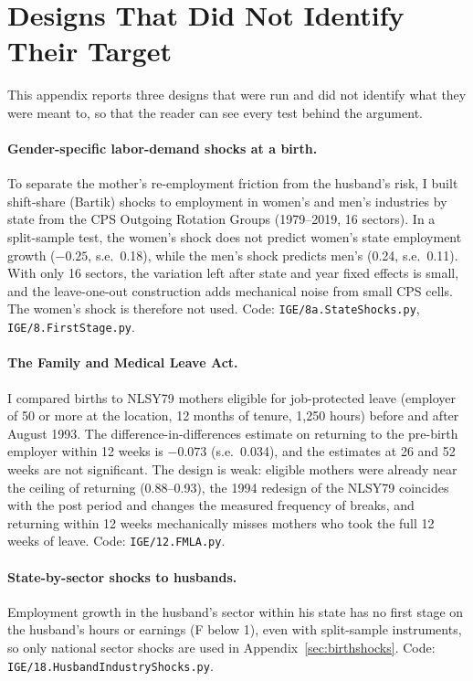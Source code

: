 \section{Designs That Did Not Identify Their Target}\label{app:designs}

This appendix reports three designs that were run and did not identify what they were meant to, so that the reader
can see every test behind the argument.

\paragraph{Gender-specific labor-demand shocks at a birth.} To separate the mother's re-employment friction from the
husband's risk, I built shift-share (Bartik) shocks to employment in women's and men's industries by state from the CPS
Outgoing Rotation Groups (1979--2019, 16 sectors). In a split-sample test, the women's shock does not predict women's
state employment growth ($-0.25$, s.e.\ 0.18), while the men's shock predicts men's (0.24, s.e.\ 0.11). With only 16
sectors, the variation left after state and year fixed effects is small, and the leave-one-out construction adds
mechanical noise from small CPS cells. The women's shock is therefore not used. Code: \texttt{IGE/8a.StateShocks.py},
\texttt{IGE/8.FirstStage.py}.

\paragraph{The Family and Medical Leave Act.} I compared births to NLSY79 mothers eligible for job-protected leave
(employer of 50 or more at the location, 12 months of tenure, 1,250 hours) before and after August 1993. The
difference-in-differences estimate on returning to the pre-birth employer within 12 weeks is $-0.073$ (s.e.\ 0.034), and
the estimates at 26 and 52 weeks are not significant. The design is weak: eligible mothers were already near the
ceiling of returning (0.88--0.93), the 1994 redesign of the NLSY79 coincides with the post period and changes the
measured frequency of breaks, and returning within 12 weeks mechanically misses mothers who took the full 12 weeks of
leave. Code: \texttt{IGE/12.FMLA.py}.

\paragraph{State-by-sector shocks to husbands.} Employment growth in the husband's sector within his state has no
first stage on the husband's hours or earnings (F below 1), even with split-sample instruments, so only national sector
shocks are used in Appendix~\ref{sec:birthshocks}. Code: \texttt{IGE/18.HusbandIndustryShocks.py}.
